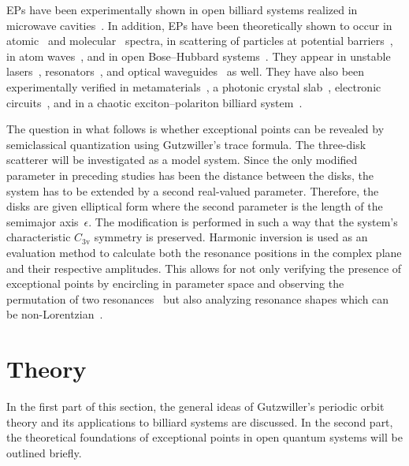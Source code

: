 \documentclass[doublecol]{epl2}
\begin{document}
EPs have been experimentally shown in open billiard systems realized in microwave cavities~\cite{dembowski_experimental_2001,dietz_exceptional_2011,bittner_scattering_2014}. In addition, EPs have been theoretically shown to occur in atomic~\cite{magunov_strong_1999-1,magunov_laser-induced_2001-1,latinne_laser-induced_1995-1,cartarius_exceptional_2007-1} and molecular~\cite{lefebvre_resonance_2009} spectra, in scattering of particles at potential barriers~\cite{hernandez_non-hermitian_2006}, in atom waves~\cite{rapedius_nonlinear_2010,cartarius_discovery_2008,gutohrlein_bifurcations_2013,abt_supersymmetric_2015}, and in open Bose--Hubbard systems~\cite{graefe_non-hermitian_2008}. They appear in unstable lasers~\cite{berry_mode_2003}, resonators~\cite{klaiman_visualization_2008}, and optical waveguides~\cite{wiersig_asymmetric_2008,wiersig_enhancing_2014} as well. They have also been experimentally verified in metamaterials~\cite{lawrence_manifestation_2014}, a photonic crystal slab~\cite{zhen_spawning_2015}, electronic circuits~\cite{stehmann_observation_2004}, and in a chaotic exciton--polariton billiard system~\cite{gao_observation_2015}.

The question in what follows is whether exceptional points can be revealed by semiclassical quantization using Gutzwiller's trace formula. The three-disk scatterer will be investigated as a model system. Since the only modified parameter in preceding studies has been the distance between the disks, the system has to be extended by a second real-valued parameter. Therefore, the disks are given elliptical form where the second parameter is the length of the semimajor axis~$\epsilon$. The modification is performed in such a way that the system's characteristic $C_{3\mathrm{v}}$ symmetry is preserved. Harmonic inversion is used as an evaluation method to calculate both the resonance positions in the complex plane and their respective amplitudes. This allows for not only verifying the presence of exceptional points by encircling in parameter space and observing the permutation of two resonances~\cite{moiseyev_non-hermitian_2011} but also analyzing resonance shapes which can be non-Lorentzian~\cite{fuchs_harmonic_2014}.

\section{Theory}
In the first part of this section, the general ideas of Gutzwiller's periodic orbit theory and its applications to billiard systems are discussed. In the second part, the theoretical foundations of exceptional points in open quantum systems will be outlined briefly.
\end{document}
